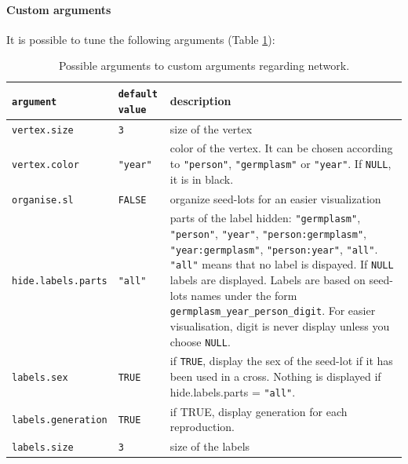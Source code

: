 \documentclass{article}\usepackage[]{graphicx}\usepackage[]{color}
\begin{document}
\paragraph{Custom arguments}

It is possible to tune the following arguments (Table \ref{custom.network}):


\begin{center}
\begin{table}[H]
\begin{tabular}{ p{} p{} p{} }
\hline
\texttt{argument} & \texttt{default value} & description \\
\hline

\texttt{vertex.size} & \texttt{3} &  size of the vertex \\

\texttt{vertex.color} & \texttt{"year"} & color of the vertex. 
It can be chosen according to  \texttt{"person"}, \texttt{"germplasm"} or \texttt{"year"}. 
If \texttt{NULL}, it is in black. \\

\texttt{organise.sl} & \texttt{FALSE} & organize seed-lots for an easier visualization \\

\texttt{hide.labels.parts} & \texttt{"all"} & parts of the label hidden: \texttt{"germplasm"}, \texttt{"person"}, \texttt{"year"}, \texttt{"person:germplasm"}, \texttt{"year:germplasm"}, \texttt{"person:year"}, \texttt{"all"}. 
\texttt{"all"} means that no label is dispayed. 
If \texttt{NULL} labels are displayed. Labels are based on seed-lots names under the form \texttt{germplasm\_year\_person\_digit}.
For easier visualisation, digit is never display unless you choose \texttt{NULL}.
\\

\texttt{labels.sex} & \texttt{TRUE} & if \texttt{TRUE}, display the sex of the seed-lot if it has been used in a cross. Nothing is displayed if hide.labels.parts = \texttt{"all"}. \\

\texttt{labels.generation} & \texttt{TRUE} & if TRUE, display generation for each reproduction. \\

\texttt{labels.size} & \texttt{3} & size of the labels \\
\hline
\end{tabular}
\caption{Possible arguments to custom arguments regarding network.}
\label{custom.network}
\end{table}
\end{center}
\end{document}
